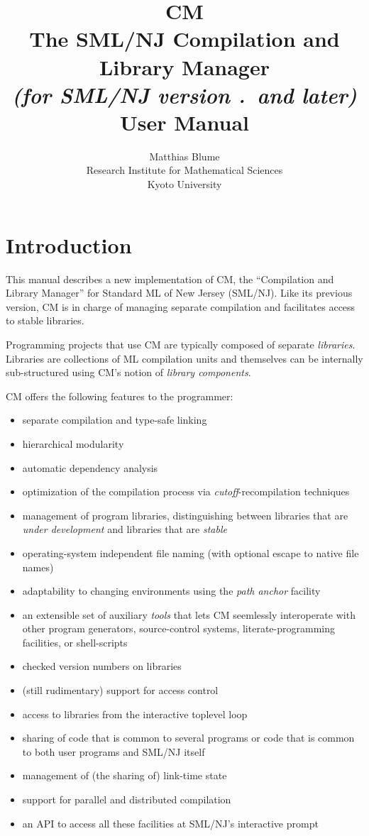 \documentclass[titlepage,letterpaper]{article}
\author{Matthias Blume \\
Research Institute for Mathematical Sciences \\
Kyoto University}
\title{{\bf CM}\\
The SML/NJ Compilation and Library Manager \\
{\it\small (for SML/NJ version \smlmj.\smlmn~and later)} \\
User Manual}
\begin{document}


\maketitle

\pagebreak

\tableofcontents

\pagebreak

\section{Introduction}

This manual describes a new implementation of CM, the ``Compilation
and Library Manager'' for Standard ML of New Jersey (SML/NJ).  Like its
previous version, CM is in charge of managing separate compilation and
facilitates access to stable libraries.

Programming projects that use CM are typically composed of separate
{\em libraries}.  Libraries are collections of ML compilation units
and themselves can be internally sub-structured using CM's notion of
{\em library components}.

CM offers the following features to the programmer:

\begin{itemize}
\item separate compilation and type-safe linking~\cite{appel94:sepcomp}
\item hierarchical modularity~\cite{blume:appel:cm99}
\item automatic dependency analysis~\cite{blume:depend99}
\item optimization of the compilation process via {\em
cutoff}-recompilation techniques~\cite{tichy94}
\item management of program libraries, distinguishing between libraries
that are {\em under development} and libraries that are {\em stable}
\item operating-system independent file naming (with optional escape
to native file names)
\item adaptability to changing environments using the {\em path anchor}
facility
\item an extensible set of auxiliary {\em tools} that lets CM
seemlessly interoperate with other program generators, source-control
systems, literate-programming facilities, or shell-scripts
\item checked version numbers on libraries
\item (still rudimentary) support for access control
\item access to libraries from the interactive toplevel loop
\item sharing of code that is common to several programs or code that
is common to both user programs and SML/NJ itself
\item management of (the sharing of) link-time state
\item support for parallel and distributed compilation
\item an API to access all these facilities at SML/NJ's interactive
prompt
\end{itemize}
\end{document}
